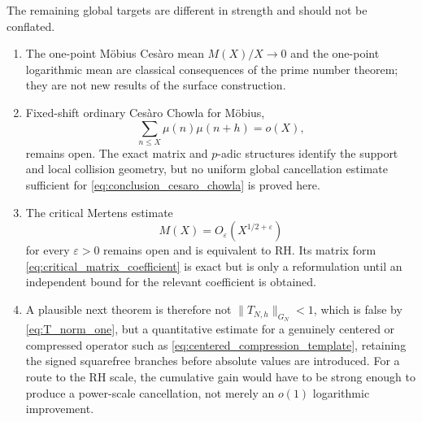\documentclass[11pt]{amsart}
\numberwithin{equation}{section}
\theoremstyle{plain}
\theoremstyle{definition}
\theoremstyle{remark}
\newcommand{\eps}{\varepsilon}
\newcommand{\mob}{\mu}
\begin{document}
The remaining global targets are different in strength and should not be conflated.

\begin{enumerate}[label=(\alph*)]
\item The one-point Möbius Cesàro mean $M(X)/X\to0$ and the one-point logarithmic mean are classical consequences of the prime number theorem; they are not new results of the surface construction.

\item Fixed-shift ordinary Cesàro Chowla for Möbius,
\begin{equation}
\sum_{n\le X}\mob(n)\mob(n+h)=o(X),
\label{eq:conclusion_cesaro_chowla}
\end{equation}
remains open.  The exact matrix and $p$-adic structures identify the support and local collision geometry, but no uniform global cancellation estimate sufficient for \eqref{eq:conclusion_cesaro_chowla} is proved here.

\item The critical Mertens estimate
\begin{equation}
M(X)=O_\eps(X^{1/2+\eps})
\label{eq:conclusion_Mertens_RH}
\end{equation}
for every $\eps>0$ remains open and is equivalent to RH.  Its matrix form \eqref{eq:critical_matrix_coefficient} is exact but is only a reformulation until an independent bound for the relevant coefficient is obtained.

\item A plausible next theorem is therefore not $\|T_{N,h}\|_{G_N}<1$, which is false by \eqref{eq:T_norm_one}, but a quantitative estimate for a genuinely centered or compressed operator such as \eqref{eq:centered_compression_template}, retaining the signed squarefree branches before absolute values are introduced.  For a route to the RH scale, the cumulative gain would have to be strong enough to produce a power-scale cancellation, not merely an $o(1)$ logarithmic improvement.
\end{enumerate}
\end{document}
